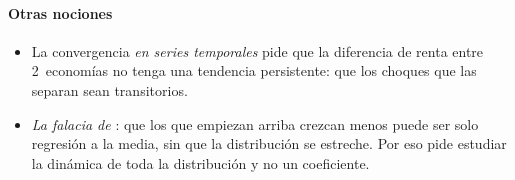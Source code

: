 \documentclass[11pt]{article}
\begin{document}
\paragraph{Otras nociones}

\begin{itemize}
\item La convergencia \emph{en series temporales} pide que la diferencia de renta entre 2~economías no tenga una tendencia persistente: que los choques que las separan sean transitorios.
\item \emph{La falacia de }: que los que empiezan arriba crezcan menos puede ser solo regresión a la media, sin que la distribución se estreche. Por eso \textcite{Quah1993} pide estudiar la dinámica de toda la distribución y no un coeficiente.
\end{itemize}
\end{document}
